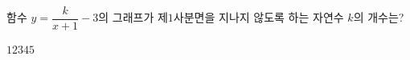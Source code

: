 \hspace*{2mm}\begin{minipage}[t]{\dimexpr\linewidth-2mm\relax}\vspace{0pt}
함수 $y=\dfrac{k}{x+1}-3$의 그래프가 제$1$사분면을 지나지 않도록 하는 자연수 $k$의 개수는?
\begin{choices32}{$1$}{$2$}{$3$}{$4$}{$5$}\end{choices32}\end{minipage}
